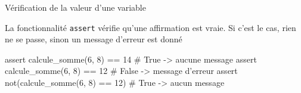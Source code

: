 \medskip


\begin{easybox}{Vérification de la valeur d'une variable}{}

La fonctionnalité \verb+assert+ vérifie qu'une affirmation est vraie. Si c'est le cas, rien ne se passe, sinon un message d'erreur est donné
	\begin{CodePythontexAlt}[TaillePolice=\normalsize, Largeur=1\linewidth,Centre,PremLigne=1, Lignes=false,]{}
assert calcule_somme(6, 8) == 14     	# True -> aucune message 
assert calcule_somme(6, 8) == 12     	# False -> message d'erreur 
assert not(calcule_somme(6, 8) == 12)	# True -> aucun message

\end{CodePythontexAlt}
\end{easybox}

